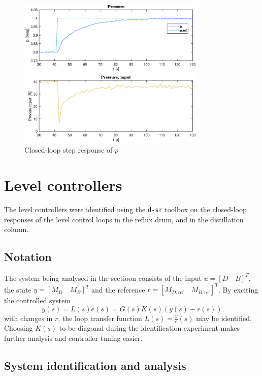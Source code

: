 \documentclass[12pt]{article}
\begin{document}
\begin{figure}[p]
\centering
\includegraphics[width=0.8\textwidth]{../Systemanalyse/Log_Data_to_Matlab/Figurer/Stegeksperimenter/PC1024_step.eps}
\caption{Closed-loop step response of $p$}
\label{fig:cl_step_PC1024}
\end{figure}


\newpage
\section{Level controllers}
The level controllers were identified using the \texttt{d-sr} toolbox on the closed-loop responses of the level control loops in the reflux drum, and in the distillation column.

\subsection{Notation}
The system being analysed in the sectioon consists of the input $u = [D \quad B]^T$, the state $y = [M_D \quad M_B]^T$ and the reference $r = [M_{D, \textrm{ref}} \quad M_{B, \textrm{ref}}]^T$. By exciting the controlled system
\begin{equation}
y(s) = L(s)e(s) = G(s) K(s) (y(s) - r(s))
\end{equation}
with changes in $r$, the loop transfer function $L(s) = \frac{y}{e}(s)$ may be identified. Choosing $K(s)$ to be diagonal during the identification experiment makes further analysis and controller tuning easier.

\subsection{System identification and analysis}
\end{document}
